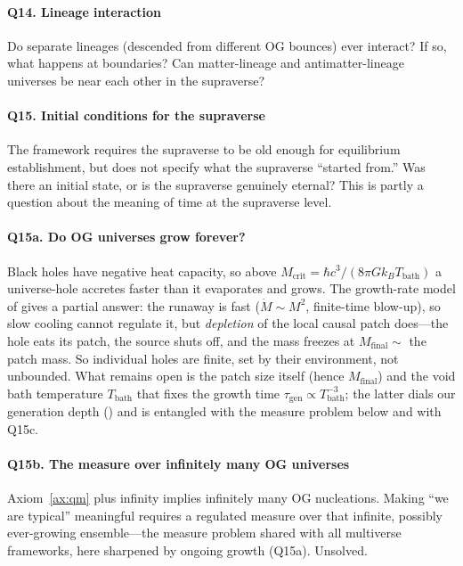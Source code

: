 \paragraph{Q14. Lineage interaction}
Do separate lineages (descended from different OG bounces) ever interact? If so,
what happens at boundaries? Can matter-lineage and antimatter-lineage universes
be near each other in the supraverse?

\paragraph{Q15. Initial conditions for the supraverse}
The framework requires the supraverse to be old enough for equilibrium
establishment, but does not specify what the supraverse ``started from.'' Was
there an initial state, or is the supraverse genuinely eternal? This is partly a
question about the meaning of time at the supraverse level.

\paragraph{Q15a. Do OG universes grow forever?}
Black holes have negative heat capacity, so above
$M_{\mathrm{crit}}=\hbar c^3/(8\pi G k_B T_{\mathrm{bath}})$ a universe-hole
accretes faster than it evaporates and grows. The growth-rate model of
 gives a partial answer: the runaway is fast
($\dot M\sim M^2$, finite-time blow-up), so slow cooling cannot regulate it, but
\emph{depletion} of the local causal patch does---the hole eats its patch, the
source shuts off, and the mass freezes at $M_{\mathrm{final}}\sim$ the patch mass.
So individual holes are finite, set by their environment, not unbounded. What
remains open is the patch size itself (hence $M_{\mathrm{final}}$) and the void
bath temperature $T_{\mathrm{bath}}$ that fixes the growth time
$\tau_{\mathrm{gen}}\propto T_{\mathrm{bath}}^{-3}$; the latter dials our
generation depth () and is entangled with the measure
problem below and with Q15c.

\paragraph{Q15b. The measure over infinitely many OG universes}
Axiom~\ref{ax:qm} plus infinity implies infinitely many OG nucleations. Making
``we are typical'' meaningful requires a regulated measure over that infinite,
possibly ever-growing ensemble---the measure problem shared with all multiverse
frameworks, here sharpened by ongoing growth (Q15a). Unsolved.

